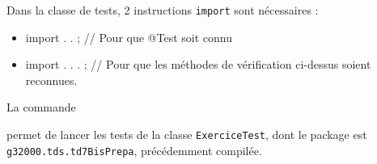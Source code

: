 \documentclass[11pt,a4paper]{article}
\begin{document}
            \par
        
                Dans la classe de tests, 2 instructions \verb|import| sont n\'ecessaires :    
							
					\begin{itemize}
				
			\item import  \textcolor{gray}{\underline{\hspace*{2em}}} . \textcolor{gray}{\underline{\hspace*{3em}}} . \textcolor{gray}{\underline{\hspace*{3em}}} ; 
                // Pour que @Test soit connu
                
			\item import  \textcolor{gray}{\underline{\hspace*{5em}}}  \textcolor{gray}{\underline{\hspace*{2em}}} . \textcolor{gray}{\underline{\hspace*{3em}}} . \textcolor{gray}{\underline{\hspace*{5em}}} . \textcolor{gray}{\underline{\hspace*{1em}}} ; 
                // Pour que les m\'ethodes de v\'erification ci-dessus soient reconnues.
                
					\end{itemize}
				
            \par
            
								La commande
								\par
				 \textcolor{gray}{\underline{\hspace*{3em}}}  \textcolor{gray}{\underline{\hspace*{16em}}}  \textcolor{gray}{\underline{\hspace*{20em}}}  \par
				
								permet de lancer les tests de la classe \verb|ExerciceTest|, 
								dont le package est \verb|g32000.tds.td7BisPrepa|, pr\'ec\'edemment compil\'ee.    
							
            \par
\end{document}
